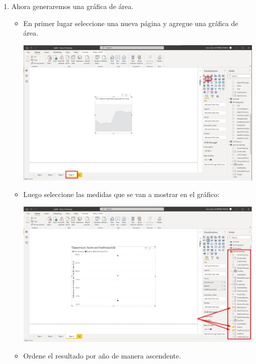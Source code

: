 \documentclass[12pt,letterpaper]{article}
\newcommand\tab[1][1cm]{\hspace*{#1}}
\begin{document}
\begin{enumerate}[\tab 1.]
\begin{itemize}
\begin{center}
            \end{center}
        \end{itemize}
        \item Ahora generaremos una gráfica de área.
        \begin{itemize}
            \item En primer lugar seleccione una nueva página y agregue una gráfica de área.
            \begin{center}
                \includegraphics[width=13cm]{./img/img11.1.png}
            \end{center}
            \item Luego seleccione las medidas que se van a mostrar en el gráfico:
            \begin{center}
                \includegraphics[width=13cm]{./img/img11.2.png}
            \end{center}
            \item Ordene el resultado por año de manera ascendente.
            \begin{center}

\end{center}
\end{itemize}
\end{enumerate}
\end{document}
